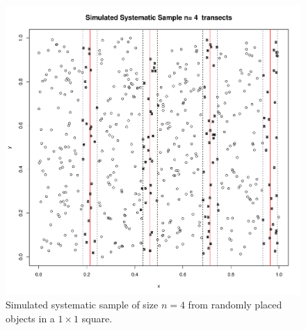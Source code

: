 \documentclass[12pt]{amsart}
\begin{document}
\begin{multicols}{2}
\begin{figure}
  \begin{center}
    \includegraphics[width=\textwidth]{../simulated_sample.pdf}
    \caption{Simulated systematic sample of size $n=4$ from randomly placed objects in a $1\times 1$ square.}
  \end{center}
\end{figure}

\end{multicols}
\end{document}
